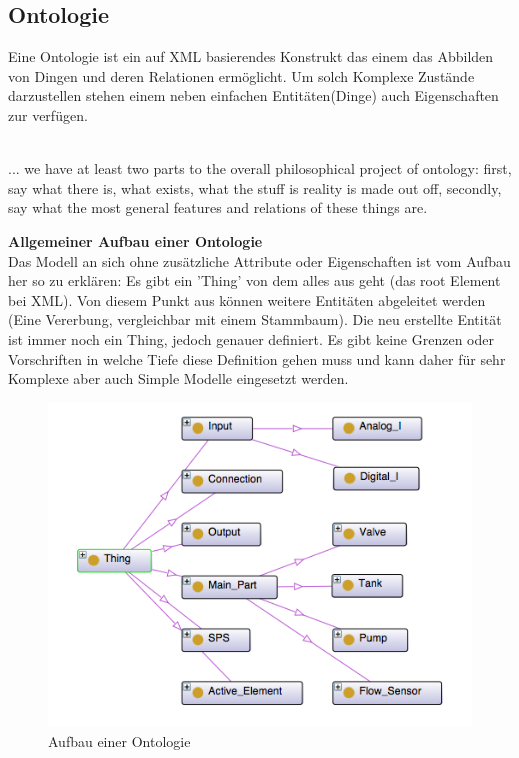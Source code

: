 \subsection{Ontologie}
Eine Ontologie ist ein auf XML basierendes Konstrukt das einem das Abbilden von Dingen und deren Relationen ermöglicht. Um solch Komplexe Zustände darzustellen stehen einem neben einfachen Entitäten(Dinge) auch Eigenschaften zur verfügen.\\
\\
\begin{displayquote}... we have at least two parts to the overall philosophical project of ontology: first, say what there is, what exists, what the stuff is reality is made out off, secondly, say what the most general features and relations of these things are.
\end{displayquote}
\textbf{Allgemeiner Aufbau einer Ontologie}\\
Das Modell an sich ohne zusätzliche Attribute oder Eigenschaften ist vom Aufbau her so zu erklären: Es gibt ein 'Thing' von dem alles aus geht (das root Element bei XML). Von diesem Punkt aus können weitere Entitäten abgeleitet werden (Eine Vererbung, vergleichbar mit einem Stammbaum). Die neu erstellte Entität ist immer noch ein Thing, jedoch genauer definiert. Es gibt keine Grenzen oder Vorschriften in welche Tiefe diese Definition gehen muss und kann daher für sehr Komplexe aber auch Simple Modelle eingesetzt werden.\\

\begin{figure}[hbt!]
 \centering
  \includegraphics[width=1\textwidth]{graphics/stateoftheart/Ontology_Aufbau}
  \caption{Aufbau einer Ontologie}
\end{figure}

